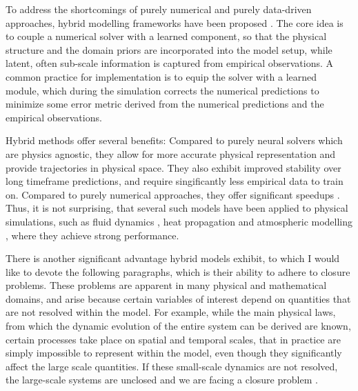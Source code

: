 To address the shortcomings of purely numerical and purely data-driven approaches, hybrid modelling frameworks have been proposed \cite{chen2018neural, neuralgcm}. The core idea is to couple a numerical solver with a learned component, so that the physical structure and the domain priors are incorporated into the model setup, while latent, often sub-scale information is captured from empirical observations. A common practice for implementation is to equip the solver with a learned module, which during the simulation corrects the numerical predictions to minimize some error metric derived from the numerical predictions and the empirical observations.

Hybrid methods offer several benefits: Compared to purely neural solvers which are physics agnostic, they allow for more accurate physical representation and provide trajectories in physical space. They also exhibit improved stability over long timeframe predictions, and require singificantly less empirical data to train on. Compared to purely numerical approaches, they offer significant speedups \cite{Kashinath2021, Meng2025, Kochkov2021}. Thus, it is not surprising, that several such models have been applied to physical simulations, such as fluid dynamics \cite{Kochkov2021}, heat propagation \cite{Liao2023} and atmospheric modelling \cite{neuralgcm}, where they achieve strong performance.

There is another significant advantage hybrid models exhibit, to which I would like to devote the following paragraphs, which is their ability to adhere to closure problems. These problems are apparent in many physical and mathematical domains, and arise because certain variables of interest depend on quantities that are not resolved within the model. For example, while the main physical laws, from which the dynamic evolution of the entire system can be derived are known, certain processes take place on spatial and temporal scales, that in practice are simply impossible to represent within the model, even though they significantly affect the large scale quantities. If these small-scale dynamics are not resolved, the large-scale systems are unclosed and we are facing a closure problem \cite{sanderse2024scientific}. 

